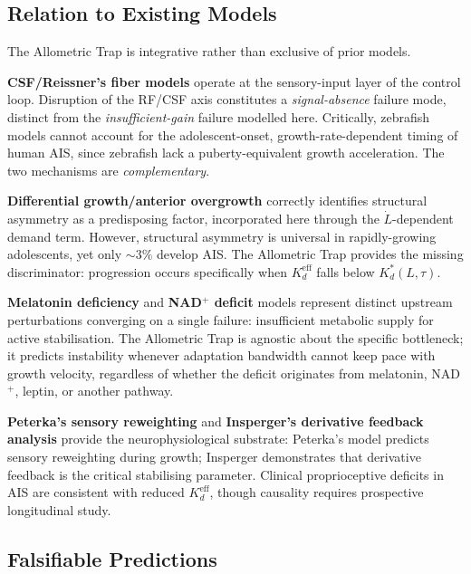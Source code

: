 \documentclass[12pt, letterpaper]{article}
\newcommand{\Kdcrit}{K_d^{*}}
\newcommand{\Kdeff}{K_d^{\mathrm{eff}}}
\begin{document}
\subsection{Relation to Existing Models}

The Allometric Trap is integrative rather than exclusive of prior models.

\textbf{CSF/Reissner's fiber models} \citep{CantautBelarif2018,
Troutwine2020} operate at the sensory-input layer of the control loop.
Disruption of the RF/CSF axis constitutes a \emph{signal-absence} failure mode,
distinct from the \emph{insufficient-gain} failure modelled here. Critically,
zebrafish models cannot account for the adolescent-onset, growth-rate-dependent
timing of human AIS, since zebrafish lack a puberty-equivalent growth
acceleration. The two mechanisms are \emph{complementary}.

\textbf{Differential growth/anterior overgrowth} \citep{Castelein2005}
correctly identifies structural asymmetry as a predisposing factor, incorporated
here through the $\dot{L}$-dependent demand term. However, structural asymmetry
is universal in rapidly-growing adolescents, yet only $\sim3\%$ develop AIS.
The Allometric Trap provides the missing discriminator: progression occurs
specifically when $\Kdeff$ falls below $\Kdcrit(L, \tau)$.

\textbf{Melatonin deficiency} \citep{Machida1993} and \textbf{NAD$^+$ deficit}
models represent distinct upstream perturbations converging on a single failure:
insufficient metabolic supply for active stabilisation. The Allometric Trap is
agnostic about the specific bottleneck; it predicts instability whenever
adaptation bandwidth cannot keep pace with growth velocity, regardless of whether
the deficit originates from melatonin, NAD$^{+}$, leptin, or another pathway.

\textbf{Peterka's sensory reweighting} \citep{Peterka2002} and
\textbf{Insperger's derivative feedback analysis} \citep{Insperger2013}
provide the neurophysiological substrate: Peterka's model predicts
sensory reweighting during growth; Insperger demonstrates that derivative
feedback is the critical stabilising parameter. Clinical proprioceptive deficits
in AIS \citep{Chow2006, Mallau2007} are consistent with reduced $\Kdeff$,
though causality requires prospective longitudinal study.

\subsection{Falsifiable Predictions}
\end{document}
